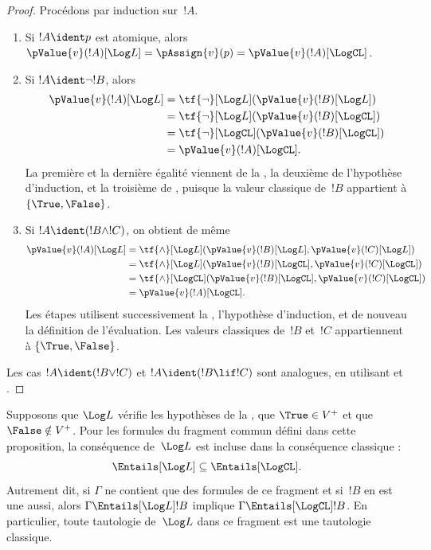 \documentclass[../../../include/open-logic-section]{subfiles}
\begin{document}
\begin{proof}
Procédons par induction sur~$!A$.
\begin{enumerate}
\item Si $!A\ident p$ est atomique,
  alors
  $\pValue{v}(!A)[\Log L]
   =\pAssign{v}(p)
   =\pValue{v}(!A)[\LogCL]$.
\item Si $!A\ident\lnot !B$, alors
  \begin{align*}
    \pValue{v}(!A)[\Log L]
      &=\tf{\lnot}[\Log L]
        (\pValue{v}(!B)[\Log L])\\
      &=\tf{\lnot}[\Log L]
        (\pValue{v}(!B)[\LogCL])\\
      &=\tf{\lnot}[\LogCL]
        (\pValue{v}(!B)[\LogCL])\\
      &=\pValue{v}(!A)[\LogCL].
  \end{align*}
  La première et la dernière égalité
  viennent de la ,
  la deuxième de l'hypothèse
  d'induction, et la troisième de
  , puisque la valeur
  classique de~$!B$ appartient à
  $\{\True,\False\}$.
\item Si $!A\ident(!B\land !C)$,
  on obtient de même
  \begin{align*}
    \pValue{v}(!A)[\Log L]
      &=\tf{\land}[\Log L]
        (\pValue{v}(!B)[\Log L],
         \pValue{v}(!C)[\Log L])\\
      &=\tf{\land}[\Log L]
        (\pValue{v}(!B)[\LogCL],
         \pValue{v}(!C)[\LogCL])\\
      &=\tf{\land}[\LogCL]
        (\pValue{v}(!B)[\LogCL],
         \pValue{v}(!C)[\LogCL])\\
      &=\pValue{v}(!A)[\LogCL].
  \end{align*}
  Les étapes utilisent successivement
  la , l'hypothèse
  d'induction,  et
  de nouveau la définition de
  l'évaluation. Les valeurs classiques
  de~$!B$ et~$!C$ appartiennent à
  $\{\True,\False\}$.
\end{enumerate}
Les cas $!A\ident(!B\lor !C)$ et
$!A\ident(!B\lif !C)$ sont analogues,
en utilisant  et
.
\end{proof}

\begin{cor}
Supposons que $\Log L$ vérifie les
hypothèses de la ,
que $\True\in V^+$ et que
$\False\notin V^+$. Pour les formules
du fragment commun défini dans cette
proposition, la conséquence de~$\Log L$
est incluse dans la conséquence
classique :
\[
  {\Entails[\Log L]}
    \subseteq {\Entails[\LogCL]}.
\]
Autrement dit, si $\Gamma$ ne contient
que des formules de ce fragment et
si~$!B$ en est une aussi, alors
$\Gamma\Entails[\Log L] !B$
implique $\Gamma\Entails[\LogCL] !B$.
En particulier, toute tautologie
de~$\Log L$ dans ce fragment est
une tautologie classique.
\end{cor}
\end{document}
